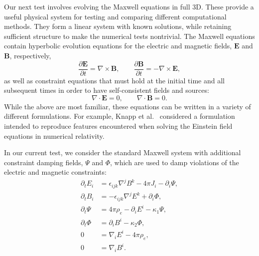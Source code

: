 Our next test involves evolving the Maxwell equations in full 3D.  These provide a useful physical system for testing and
comparing different computational methods. They form a linear system with
known solutions, while retaining sufficient structure to make the numerical
tests nontrivial. The Maxwell equations contain hyperbolic
evolution equations for the electric and magnetic fields, $\mathbf{E}$ and
$\mathbf{B}$, respectively,
\begin{equation}
\label{eq:maxwell_evolution}
\frac{\partial \mathbf{E}}{\partial t}
    = \nabla \times \mathbf{B},
\qquad
\frac{\partial \mathbf{B}}{\partial t}
    = -\nabla \times \mathbf{E},
\end{equation}
as well as constraint equations that must hold at the initial time and all subsequent times in order to have self-consistent fields and sources:  
\begin{equation}
\label{eq:maxwell_constraints}
\nabla \cdot \mathbf{E} = 0,
\qquad
\nabla \cdot \mathbf{B} = 0.
\end{equation}
While the above are most familiar, these equations can be written in a variety of different formulations. For example, Knapp et al.~\cite{Knapp:2002fm} considered a formulation intended to reproduce features encountered when solving the Einstein field equations in numerical relativity.

In our current test, we consider the standard Maxwell system with additional
constraint damping fields, $\Psi$ and $\Phi$, which are used to damp
violations of the electric and magnetic constraints:
\begin{align}
\partial_t E_i
    &= \epsilon_{ijk}\nabla^j B^k - 4\pi J_i - \partial_i \Psi,
\label{eq:maxwell_evolution_E}
\\
\partial_t B_i
    &= -\epsilon_{ijk}\nabla^j E^k + \partial_i \Phi,
\label{eq:maxwell_evolution_B}
\\
\partial_t \Psi
    &= 4\pi \rho_e - \partial_i E^i - \kappa_1 \Psi,
\label{eq:maxwell_evolution_Psi}
\\
\partial_t \Phi
    &= \partial_i B^i - \kappa_2 \Phi,
\label{eq:maxwell_evolution_Phi}
\\
0
    &= \nabla_i E^i - 4\pi \rho_e,
\label{eq:maxwell_constraint_E}
\\
0
    &= \nabla_i B^i.
\label{eq:maxwell_constraint_B}
\end{align}

